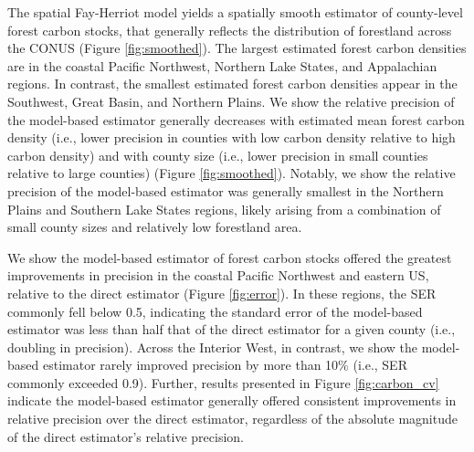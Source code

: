 \documentclass[11pt]{article}
\begin{document}
The spatial Fay-Herriot model yields a spatially smooth estimator of county-level forest carbon stocks, that generally reflects the distribution of forestland across the CONUS (Figure \ref{fig:smoothed}). The largest estimated forest carbon densities are in the coastal Pacific Northwest, Northern Lake States, and Appalachian regions. In contrast, the smallest estimated forest carbon densities appear in the Southwest, Great Basin, and Northern Plains. We show the relative precision of the model-based estimator generally decreases with estimated mean forest carbon density (i.e., lower precision in counties with low carbon density relative to high carbon density) and with county size (i.e., lower precision in small counties relative to large counties) (Figure \ref{fig:smoothed}). Notably, we show the relative precision of the model-based estimator was generally smallest in the Northern Plains and Southern Lake States regions, likely arising from a combination of small county sizes and relatively low forestland area.

We show the model-based estimator of forest carbon stocks offered the greatest improvements in precision in the coastal Pacific Northwest and eastern US, relative to the direct estimator (Figure \ref{fig:error}). In these regions, the SER commonly fell below 0.5, indicating the standard error of the model-based estimator was less than half that of the direct estimator for a given county (i.e., doubling in precision). Across the Interior West, in contrast, we show the model-based estimator rarely improved precision by more than 10\% (i.e., SER commonly exceeded 0.9). Further, results presented in Figure \ref{fig:carbon_cv} indicate the model-based estimator generally offered consistent improvements in relative precision over the direct estimator, regardless of the absolute magnitude of the direct estimator's relative precision.  
\end{document}
